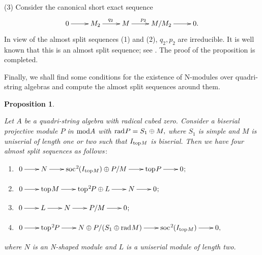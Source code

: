 \documentclass[10pt]{amsart}
\newtheorem{Prop}[Theo]{Proposition}
\theoremstyle{definition}
\newcommand{\mmod}{{\rm mod}}
\newcommand{\rad}{{\rm rad}\hspace{.5pt}}
\newcommand{\soc}{{\rm soc}\hspace{.5pt}}
\newcommand{\ntop}{{\rm top}\hspace{.5pt}}
\newcommand{\hp}{\hspace{.5pt}}
\begin{document}
(3) Consider the canonical short exact sequence 
\vspace{-4.5pt}
$$\xymatrix{0\ar[r] & M_2 \ar[r]^{q_2} & M \ar[r]^{p_2} & M/M_2 \ar[r] & 0.}\vspace{-4pt}$$ In view of the almost split sequences (1) and (2), $q_2, p_2$ are irreducible. It is well known that this is an almost split sequence; see \cite[(V.5.9)]{ARS}. The proof of the proposition is completed.

\smallskip

Finally, we shall find some conditions for the existence of N-modules over quadri-string algebras and compute the almost split sequences around them. 

\begin{Prop}\label{4str_ass_smr} 

Let $A$ be a quadri-string algebra with radical cubed zero. Consider a biserial projective module $P$ in $\mmod A$ with $\rad P=S_1\oplus M,$ where $S_1$ is simple and $M$ is uniserial of length one or two such that $I_{\ntop M}$ is biserial. Then we have four almost split sequences as follows$\hp:$ 

\begin{enumerate}[$(1)$]

\vspace{-1.5pt}

\item $\xymatrixcolsep{20pt}\xymatrix{0\ar[r] & N\ar[r] & \soc^2\hspace{-.5pt}(I_{\ntop M})\oplus P/M \ar[r] & \ntop P \ar[r] & 0\hp ;}$

\vspace{-2.5pt}

\item $\xymatrixcolsep{20pt}\xymatrix{0\ar[r] & \ntop M \ar[r] & \ntop^2\hspace{-1pt}P \oplus L\ar[r] & N\ar[r] & 0\hp ;}$

\vspace{-2.5pt}

\item $\xymatrixcolsep{20pt}\xymatrix{0\ar[r] & L \ar[r] & N\ar[r] & P/M\ar[r] & 0\hp ;}$

\vspace{-3.5pt}

\item $\xymatrixcolsep{20pt}\xymatrix{0\ar[r] & \ntop^2\hspace{-1pt}P \ar[r] & N\oplus P/(S_1\oplus \rad M) \ar[r] & \soc^2\hspace{-.5pt}(I_{\ntop M}) \ar[r] & 0,}$

\end{enumerate}

\vspace{-2pt}

\noindent where $N$ is an N-shaped module and $L$ is a uniserial module of length two.

\end{Prop}
\end{document}
